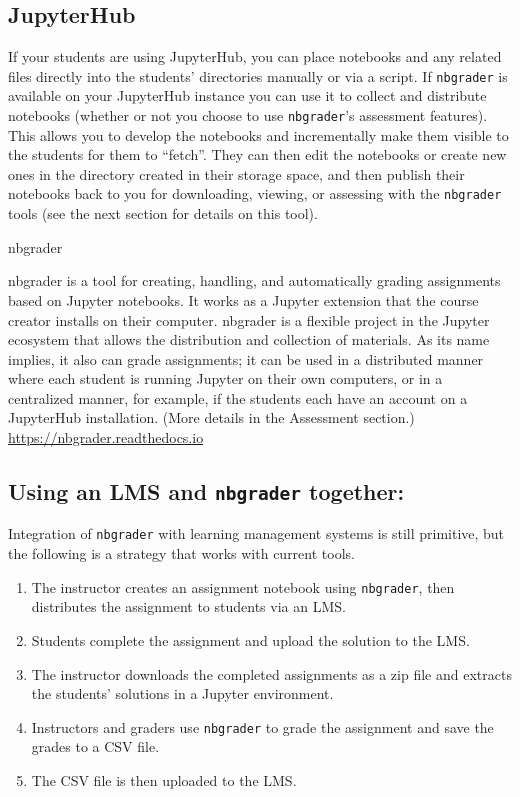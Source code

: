 \documentclass[]{book}
\begin{document}
\subsection{JupyterHub}\label{jupyterhub}

If your students are using JupyterHub, you can place notebooks and any
related files directly into the students' directories manually or via a
script. If \texttt{nbgrader} is available on your JupyterHub instance
you can use it to collect and distribute notebooks (whether or not you
choose to use \texttt{nbgrader}'s assessment features). This allows you
to develop the notebooks and incrementally make them visible to the
students for them to ``fetch''. They can then edit the notebooks or
create new ones in the directory created in their storage space, and
then publish their notebooks back to you for downloading, viewing, or
assessing with the \texttt{nbgrader} tools (see the next section for
details on this tool).

nbgrader

nbgrader is a tool for creating, handling, and automatically grading
assignments based on Jupyter notebooks. It works as a Jupyter extension
that the course creator installs on their computer. nbgrader is a
flexible project in the Jupyter ecosystem that allows the distribution
and collection of materials. As its name implies, it also can grade
assignments; it can be used in a distributed manner where each student
is running Jupyter on their own computers, or in a centralized manner,
for example, if the students each have an account on a JupyterHub
installation. (More details in the Assessment section.)
\url{https://nbgrader.readthedocs.io}

\subsection{\texorpdfstring{Using an LMS and \texttt{nbgrader}
together:}{Using an LMS and nbgrader together:}}\label{using-an-lms-and-nbgrader-together}

Integration of \texttt{nbgrader} with learning management systems is
still primitive, but the following is a strategy that works with current
tools.

\begin{enumerate}
\def\labelenumi{\arabic{enumi}.}
\item
  The instructor creates an assignment notebook using \texttt{nbgrader},
  then distributes the assignment to students via an LMS.
\item
  Students complete the assignment and upload the solution to the LMS.
\item
  The instructor downloads the completed assignments as a zip file and
  extracts the students' solutions in a Jupyter environment.
\item
  Instructors and graders use \texttt{nbgrader} to grade the assignment
  and save the grades to a CSV file.
\item
  The CSV file is then uploaded to the LMS.
\end{enumerate}
\end{document}
